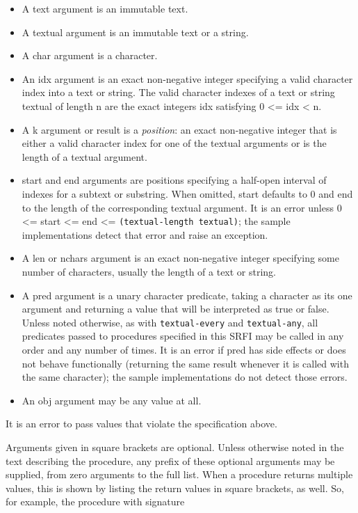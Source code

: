 \begin{itemize}
\tightlist
\item
  A text argument is an immutable text.
\item
  A textual argument is an immutable text or a string.
\item
  A char argument is a character.
\item
  An idx argument is an exact non-negative integer specifying a valid
  character index into a text or string. The valid character indexes of
  a text or string textual of length n are the exact integers idx
  satisfying 0 \textless{}= idx \textless{} n.
\item
  A k argument or result is a \emph{position}: an exact non-negative
  integer that is either a valid character index for one of the textual
  arguments or is the length of a textual argument.
\item
  start and end arguments are positions specifying a half-open interval
  of indexes for a subtext or substring. When omitted, start defaults to
  0 and end to the length of the corresponding textual argument. It is
  an error unless 0 \textless{}= start \textless{}= end \textless{}=
  \texttt{(textual-length\ textual)}; the sample implementations detect
  that error and raise an exception.
\item
  A len or nchars argument is an exact non-negative integer specifying
  some number of characters, usually the length of a text or string.
\item
  A pred argument is a unary character predicate, taking a character as
  its one argument and returning a value that will be interpreted as
  true or false. Unless noted otherwise, as with \texttt{textual-every}
  and \texttt{textual-any}, all predicates passed to procedures
  specified in this SRFI may be called in any order and any number of
  times. It is an error if pred has side effects or does not behave
  functionally (returning the same result whenever it is called with the
  same character); the sample implementations do not detect those
  errors.
\item
  An obj argument may be any value at all.
\end{itemize}

It is an error to pass values that violate the specification above.

Arguments given in square brackets are optional. Unless otherwise noted
in the text describing the procedure, any prefix of these optional
arguments may be supplied, from zero arguments to the full list. When a
procedure returns multiple values, this is shown by listing the return
values in square brackets, as well. So, for example, the procedure with
signature

